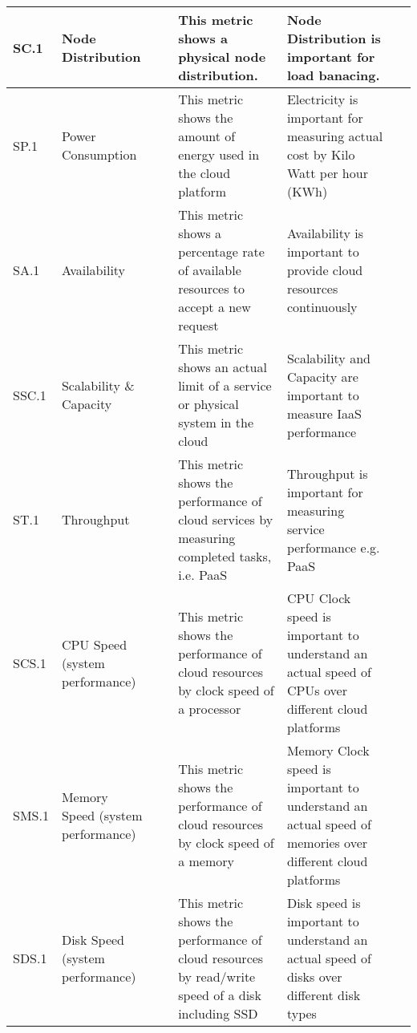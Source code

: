\begin{table*}[p]
\begin{scriptsize}
\begin{center}
\begin{tabular}{lp{}p{}p{}p{}p{}}
\hline
SC.1 & 
Node Distribution & 
~ &
This metric shows a physical node distribution. & 
Node Distribution is important for load banacing. & 
~ \\
\hline
SP.1 &
Power Consumption&
~&
This metric shows the amount of energy used in the cloud platform  &
Electricity is important for measuring actual cost by Kilo Watt per hour (KWh) &
~ \\
\hline
SA.1 &
Availability&
~&
This metric shows a percentage rate of available resources to accept a new request &
Availability is important to provide cloud resources continuously
~ \\
\hline
SSC.1 &
Scalability \& Capacity&
~&
This metric shows an actual limit of a service or physical system in the cloud &
Scalability and Capacity are important to measure IaaS performance &
~ \\
\hline
ST.1 &
Throughput &
~&
This metric shows the performance of cloud services by measuring completed tasks, i.e. PaaS &
Throughput is important for measuring service performance e.g. PaaS &
~ \\
\hline
SCS.1 &
CPU Speed (system performance)&
~&
This metric shows the performance of cloud resources by clock speed of a processor &
CPU Clock speed is important to understand an actual speed of CPUs over different cloud platforms &
~ \\
\hline
SMS.1 &
Memory Speed (system performance)&
~&
This metric shows the performance of cloud resources by clock speed of a memory &
Memory Clock speed is important to understand an actual speed of memories over different cloud platforms &
~ \\
\hline
SDS.1 &
Disk Speed (system performance)&
~&
This metric shows the performance of cloud resources by read/write speed of a disk including SSD &
Disk speed is important to understand an actual speed of disks over different disk types&
~ \\
\hline


\end{tabular}
\end{center}
\end{scriptsize}
\end{table*}
